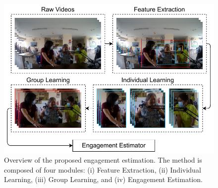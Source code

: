 \documentclass[VANCOUVER,STIX1COL]{WileyNJD-v2}
\begin{document}
\begin{figure}[t]
  \centering
  \includegraphics[width=0.82\linewidth]{assets/architecture.drawio}
  \caption{Overview of the proposed engagement estimation. The method is composed of four modules: (i) Feature Extraction, (ii) Individual Learning, (iii) Group Learning, and (iv) Engagement Estimation.}
  \label{f:architecture}
\end{figure}
\end{document}
